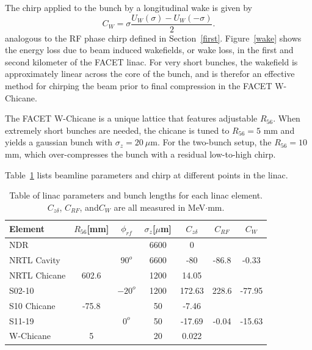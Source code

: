 \documentclass[%
twocolumn,
showpacs,preprintnumbers,
 aps,
prstab,
]{revtex4-1}
\begin{document}
The chirp applied to the bunch by a longitudinal wake is given by 
\begin{equation}
C_{W} = \sigma \frac{U_{W}(\sigma) - U_{W}(-\sigma)}{2}.
\end{equation}
analogous to the RF phase chirp defined in Section~\ref{first}. Figure~\ref{wake} shows the energy loss due to beam induced wakefields, or wake loss, in the first and second kilometer of the FACET linac. For very short bunches, the wakefield is approximately linear across the core of the bunch, and is therefor an effective method for chirping the beam prior to final compression in the FACET W-Chicane.


The FACET W-Chicane is a unique lattice that features adjustable $R_{56}$.  When extremely short bunches are needed, the chicane is tuned to $R_{56} = 5$ mm and yields a gaussian bunch with $\sigma_z = 20~\mu$m. For the two-bunch setup, the $R_{56} = 10$ mm, which over-compresses the bunch with a residual low-to-high chirp. 

Table~\ref{dat_table} lists beamline parameters and chirp at different points in the linac.

\begin{table}
  \begin{tabular}{ l c c c c c c}
    \hline
    Element & $R_{56} $[mm] & $\phi_{rf}$ & $\sigma_z$[$\mu$m] & $C_{z\delta}$ & $C_{RF}$ & $C_{W}$ \\ \hline
    NDR &  & & 6600 & 0 & & \\
    NRTL Cavity &  & $ 90^o$ & 6600 & -80 & -86.8 & -0.33 \\
    NRTL Chicane & 602.6 & & 1200 & 14.05 &  & \\
    S02-10 &  & $-20^o$ & 1200 & 172.63 & 228.6 & -77.95 \\
    S10 Chicane & -75.8 & & 50 & -7.46 & & \\
    S11-19 & & $0^o$ & 50 & -17.69 & -0.04 & -15.63 \\
    W-Chicane & 5 & & 20 & 0.022 & & \\
    \hline
  \end{tabular}
   \caption{Table of linac parameters and bunch lengths for each linac element. $C_{z\delta}$, $C_{RF}$, and$C_{W}$ are all measured in MeV$\cdot$mm.}
   \label{dat_table}
\end{table}
\end{document}
